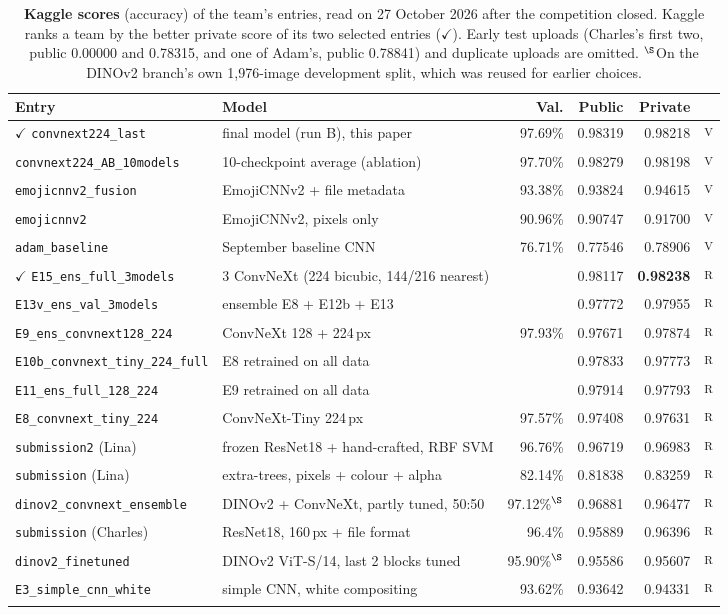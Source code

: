 \documentclass[11pt,a4paper]{article}
\newcommand{\ver}{\textsuperscript{\textcolor{verified}{\sffamily\scriptsize V}}}
\newcommand{\rep}{\textsuperscript{\textcolor{reported}{\sffamily\scriptsize R}}}
\newcommand{\code}[1]{\texttt{#1}}
\begin{document}
\begin{table}[t]
\centering\small
\caption{\textbf{Kaggle scores} (accuracy) of the team's entries, read on 27 October 2026 after the competition closed. Kaggle ranks a team by the better private score of its two selected entries ($\checkmark$). Early test uploads (Charles's first two, public 0.00000 and 0.78315, and one of Adam's, public 0.78841) and duplicate uploads are omitted. $^\S$On the DINOv2 branch's own 1{,}976-image development split, which was reused for earlier choices.}
\label{tab:kaggle}
\footnotesize\setlength{\tabcolsep}{4pt}
\begin{tabular}{@{}llrrrc@{}}
\toprule
Entry & Model & Val. & Public & Private & \\
\midrule
\rowcolor{panel}$\checkmark$ \code{convnext224\_last} & final model (run B), this paper & 97.69\% & 0.98319 & 0.98218 & \ver\\
\code{convnext224\_AB\_10models} & 10-checkpoint average (ablation) & 97.70\% & 0.98279 & 0.98198 & \ver\\
\code{emojicnnv2\_fusion} & EmojiCNNv2 + file metadata & 93.38\% & 0.93824 & 0.94615 & \ver\\
\code{emojicnnv2} & EmojiCNNv2, pixels only & 90.96\% & 0.90747 & 0.91700 & \ver\\
\code{adam\_baseline} & September baseline CNN & 76.71\% & 0.77546 & 0.78906 & \ver\\
\midrule
$\checkmark$ \code{E15\_ens\_full\_3models} & 3 ConvNeXt (224 bicubic, 144/216 nearest) & & 0.98117 & \textbf{0.98238} & \rep\\
\code{E13v\_ens\_val\_3models} & ensemble E8 + E12b + E13 & & 0.97772 & 0.97955 & \rep\\
\code{E9\_ens\_convnext128\_224} & ConvNeXt 128 + 224\,px & 97.93\% & 0.97671 & 0.97874 & \rep\\
\code{E10b\_convnext\_tiny\_224\_full} & E8 retrained on all data & & 0.97833 & 0.97773 & \rep\\
\code{E11\_ens\_full\_128\_224} & E9 retrained on all data & & 0.97914 & 0.97793 & \rep\\
\code{E8\_convnext\_tiny\_224} & ConvNeXt-Tiny 224\,px & 97.57\% & 0.97408 & 0.97631 & \rep\\
\code{submission2} (Lina) & frozen ResNet18 + hand-crafted, RBF SVM & 96.76\% & 0.96719 & 0.96983 & \rep\\
\code{submission} (Lina) & extra-trees, pixels + colour + alpha & 82.14\% & 0.81838 & 0.83259 & \rep\\
\code{dinov2\_convnext\_ensemble} & DINOv2 + ConvNeXt, partly tuned, 50:50 & 97.12\%$^\S$ & 0.96881 & 0.96477 & \rep\\
\code{submission} (Charles) & ResNet18, 160\,px + file format & 96.4\% & 0.95889 & 0.96396 & \rep\\
\code{dinov2\_finetuned} & DINOv2 ViT-S/14, last 2 blocks tuned & 95.90\%$^\S$ & 0.95586 & 0.95607 & \rep\\
\code{E3\_simple\_cnn\_white} & simple CNN, white compositing & 93.62\% & 0.93642 & 0.94331 & \rep\\
\bottomrule
\end{tabular}
\end{table}
\end{document}

